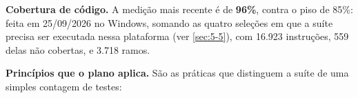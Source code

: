 
\textbf{Cobertura de código.} A medição mais recente é de \textbf{96\%}, contra o piso de 85\%: feita em 25/09/2026 no Windows, somando as quatro seleções em que a suíte precisa ser executada nessa plataforma (ver \ref{sec:5-5}), com 16.923 instruções, 559 delas não cobertas, e 3.718 ramos.


\textbf{Princípios que o plano aplica.} São as práticas que distinguem a suíte de uma simples contagem de testes:

